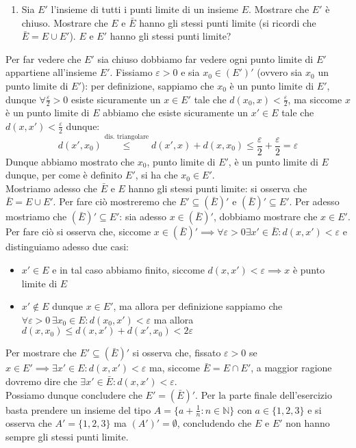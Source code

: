 \documentclass{report}
\begin{document}
\begin{enumerate}[resume, label=\protect\circled{\arabic*}]
	\item Sia $E'$ l'insieme di tutti i punti limite di un insieme $E$. Mostrare che $E'$ è chiuso. Mostrare che $E$ e $\bar{E}$ hanno gli stessi punti limite (si ricordi che $\bar{E} = E \cup E'$). $E$ e $E'$ hanno gli stessi punti limite?
\end{enumerate}
\begin{mysolution}
	Per far vedere che $E'$ sia chiuso dobbiamo far vedere ogni punto limite di $E'$ appartiene all'insieme $E'$. Fissiamo $\varepsilon > 0$ e sia $x_0 \in (E')'$ (ovvero sia $x_0$ un punto limite di $E'$): per definizione, sappiamo che $x_0$ è un punto limite di $E'$, dunque $\forall \frac{\varepsilon}{2} > 0$ esiste sicuramente un $x \in E'$ tale che $d(x_0, x) < \frac{\varepsilon}{2}$, ma siccome $x$ è un punto limite di $E$ abbiamo che esiste sicuramente un $x' \in E$ tale che $d(x, x') < \frac{\varepsilon}{2}$ dunque:
	$$
		d(x', x_0) \stackrel{\text{dis. triangolare}}{\leq} d(x', x) + d(x, x_0) \leq \frac{\varepsilon}{2} + \frac{\varepsilon}{2} = \varepsilon
	$$
	Dunque abbiamo mostrato che $x_0$, punto limite di $E'$, è un punto limite di $E$ dunque, per come è definito $E'$, si ha che $x_0 \in E'$. \\
	Mostriamo adesso che $\bar{E}$ e $E$ hanno gli stessi punti limite: si osserva che $\bar{E} = E \cup E'$. Per fare ciò mostreremo che $E' \subseteq (\bar{E})'$ e $(\bar{E})' \subseteq E'$. Per adesso mostriamo che $(\bar{E})' \subseteq E'$: sia adesso $x \in (\bar{E})'$, dobbiamo mostrare che $x \in E'$. Per fare ciò si osserva che, siccome $x \in (\bar{E})' \implies \forall \varepsilon > 0 \exists x' \in \bar{E}: d(x, x') < \varepsilon$ e distinguiamo adesso due casi:
	\begin{itemize}
		\item $x' \in E$ e in tal caso abbiamo finito, siccome $d(x, x') < \varepsilon \implies x$ è punto limite di $E$
		\item $x' \not\in E$ dunque $x \in E'$, ma allora per definizione sappiamo che $\forall \varepsilon > 0 \, \exists x_0 \in E: d(x_0, x') < \varepsilon$ ma allora $d(x, x_0) \leq d(x, x') + d(x', x_0) < 2\varepsilon$ 	 
	\end{itemize}
	Per mostrare che $E' \subseteq (\bar{E})'$ si osserva che, fissato $\varepsilon > 0$ se $x \in E' \implies \exists x' \in E: d(x, x') < \varepsilon$ ma, siccome $\bar{E}=E \cap E'$, a maggior ragione dovremo dire che $\exists x' \in \bar{E}: d(x, x') < \varepsilon$. \\
	Possiamo dunque concludere che $E' = (\bar{E})'$. Per la parte finale dell'esercizio basta prendere un insieme del tipo $A = \{a+\frac{1}{n}: n \in \mathbb{N}\}$ con $a \in \{1, 2, 3 \}$ e si osserva che $A' = \{1, 2, 3\}$ ma $(A')' = \emptyset$, concludendo che $E$ e $E'$ non hanno sempre gli stessi punti limite.
	

\end{mysolution}
\end{document}
